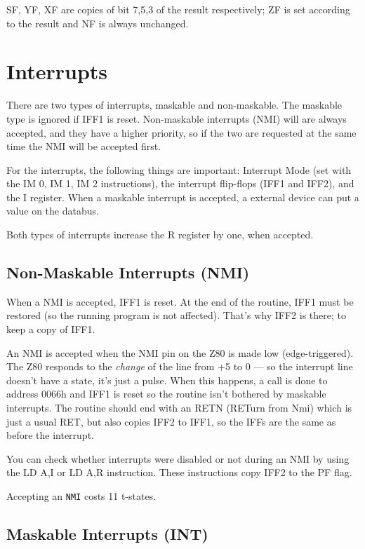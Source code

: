 \documentclass[oneside,a4paper]{book}
\begin{document}
SF, YF, XF are copies of bit 7,5,3 of the result respectively; ZF is set 
according to the result and NF is always unchanged.


\chapter{Interrupts}
\label{interrupts}

There are two types of interrupts, maskable and non-maskable. The maskable
type is ignored if IFF1 is reset. Non-maskable interrupts (NMI) will
are always accepted, and they have a higher priority, so if the two are 
requested at the same time the NMI will be accepted first.

For the interrupts, the following things are important: Interrupt Mode
(set with the {\ttfamily IM 0, IM 1, IM 2} instructions), the interrupt 
flip-flops (IFF1 and IFF2), and the I register. When a maskable interrupt
is accepted, a external device can put a value on the databus.

Both types of interrupts increase the R register by one, when accepted.


\section{Non-Maskable Interrupts (NMI)}

When a NMI is accepted, IFF1 is reset. At the end of the routine, IFF1 must
be restored (so the running program is not affected). That's why IFF2 is
there; to keep a copy of IFF1.

An NMI is accepted when the NMI pin on the Z80 is made low (edge-triggered). 
The Z80 responds to the {\em change} of the line from +5 to 0 --- so the 
interrupt line doesn't have a state, it's just a pulse. When this happens, 
a call is done to address 0066h and IFF1 is reset so the routine isn't 
bothered by maskable interrupts. The routine should end with an 
{\ttfamily RETN} (RETurn from Nmi) which is just a usual RET, but also 
copies IFF2 to IFF1, so the IFFs are the same as before the interrupt.

You can check whether interrupts were disabled or not during an NMI by using 
the {\ttfamily LD A,I} or {\ttfamily LD A,R} instruction. These instructions 
copy IFF2 to the PF flag.

Accepting an {\tt NMI} costs 11 t-states.


\section{Maskable Interrupts (INT)}
\end{document}
